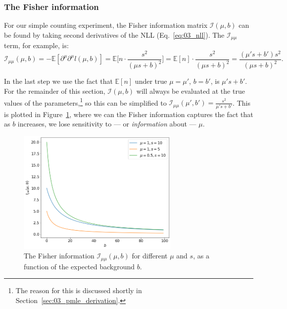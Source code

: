 \subsubsection{The Fisher information}

For our simple counting experiment, the Fisher information matrix $\mathcal I(\mu, b)$ can be found by taking second derivatives of the NLL (Eq.~\ref{eq:03_nll}). 
The $\mathcal I_{\mu\mu}$ term, for example, is:
\begin{equation}
    \mathcal I_{\mu\mu}(\mu, b) = - \mathbb E[\partial^\mu\partial^\mu l(\mu, b)] = \mathbb E \bigg[n \cdot \frac{s^2}{(\mu s + b)^2}\bigg] = \mathbb E[n] \cdot \frac{s^2}{(\mu s + b)^2} = \frac{(\mu' s + b') s^2}{(\mu s + b)^2}.
\label{eq:03_fisher}
\end{equation}

In the last step we use the fact that $\mathbb E[n]$ under true $\mu = \mu'$, $b = b'$, is $\mu' s + b'$.
For the remainder of this section, $\mathcal I(\mu, b)$ will always be evaluated at the true values of the parameters,\footnote{The reason for this is discussed shortly in Section~\ref{sec:03_pmle_derivation}.} so this can be simplified to $\mathcal I_{\mu\mu}(\mu', b') = \frac{s^2}{\mu' s + b'}$.
This is plotted in Figure~\ref{fig:03_fisher}, where we can the Fisher information captures the fact that as $b$ increases, we lose sensitivity to --- or \textit{information} about --- $\mu$.

\begin{figure}[htb]
\centering
\includegraphics[width=0.7\textwidth]{figures/03-Stats/05-asymptotic-mle/3.png}
\caption{The Fisher information $\mathcal I_{\mu\mu}(\mu, b)$ for different $\mu$ and $s$, as a function of the expected background $b$.}
\label{fig:03_fisher}
\end{figure}

